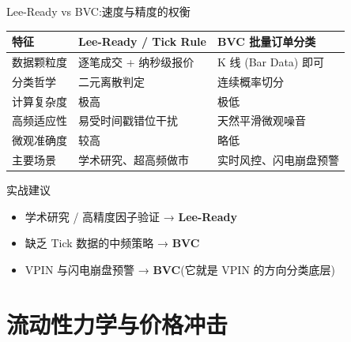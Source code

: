 \documentclass[10pt,aspectratio=169]{beamer}
\begin{document}
\begin{frame}{Lee-Ready vs BVC:速度与精度的权衡}

  \small
  \begin{tabular}{p{3.2cm}|p{4.0cm}|p{4.5cm}}
    \toprule
    \textbf{特征} & \textbf{Lee-Ready / Tick Rule} & \textbf{BVC 批量订单分类} \\
    \midrule
    数据颗粒度 & 逐笔成交 + 纳秒级报价 & K 线 (Bar Data) 即可 \\
    分类哲学 & 二元离散判定 & 连续概率切分 \\
    计算复杂度 & 极高 & 极低 \\
    高频适应性 & 易受时间戳错位干扰 & 天然平滑微观噪音 \\
    微观准确度 & 较高 & 略低 \\
    主要场景 & 学术研究、超高频做市 & 实时风控、闪电崩盘预警 \\
    \bottomrule
  \end{tabular}

  \vfill

  \begin{alertblock}{实战建议}
    \begin{itemize}
      \item 学术研究 / 高精度因子验证 → \textbf{Lee-Ready}
      \item 缺乏 Tick 数据的中频策略 → \textbf{BVC}
      \item VPIN 与闪电崩盘预警 → \textbf{BVC}(它就是 VPIN 的方向分类底层)
    \end{itemize}
  \end{alertblock}

\end{frame}

\section{流动性力学与价格冲击}
\end{document}
